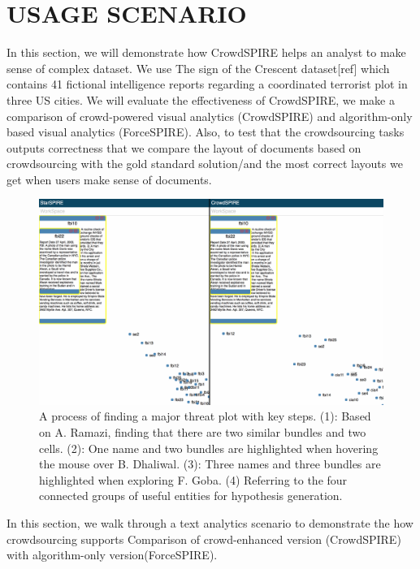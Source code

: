 \documentclass[journal]{vgtc}                %
\begin{document}

\section{USAGE SCENARIO}


In this section, we will demonstrate how CrowdSPIRE helps an analyst to make sense of complex dataset.
We use The sign of the Crescent dataset[ref] which contains 41 fictional intelligence reports regarding a coordinated terrorist plot in three US cities.
We will evaluate the effectiveness of CrowdSPIRE, we make a comparison of crowd-powered visual analytics (CrowdSPIRE) and algorithm-only based visual analytics (ForceSPIRE).
Also, to test that the crowdsourcing tasks outputs correctness that we compare the layout of documents based on crowdsourcing with the gold standard solution/and the most correct layouts we get when users make sense of documents.
\begin{figure}
 \centering
  \includegraphics[width=\textwidth]{Case}
 \caption{A process of finding a major threat plot with key steps. (1): Based on A. Ramazi, finding that there are two similar bundles and two cells. (2): One name and two bundles are highlighted when hovering the mouse over B. Dhaliwal. (3): Three names and three bundles are highlighted when exploring F. Goba. (4) Referring to the four connected groups of useful entities for hypothesis generation.}
 \label{fig:case}
\end{figure}

In this section, we walk through a text analytics scenario to demonstrate the how crowdsourcing supports
Comparison of crowd-enhanced version (CrowdSPIRE) with algorithm-only version(ForceSPIRE).
\end{document}
